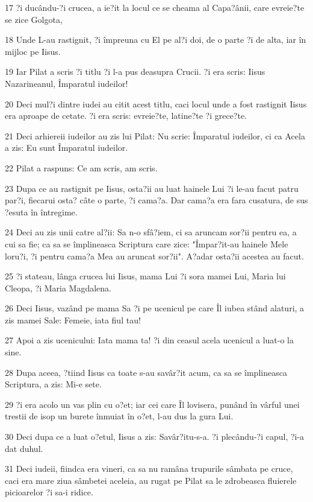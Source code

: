\par 17 ?i ducându-?i crucea, a ie?it la locul ce se cheama al Capa?ânii, care evreie?te se zice Golgota,
\par 18 Unde L-au rastignit, ?i împreuna cu El pe al?i doi, de o parte ?i de alta, iar în mijloc pe Iisus.
\par 19 Iar Pilat a scris ?i titlu ?i l-a pus deasupra Crucii. ?i era scris: Iisus Nazarineanul, Împaratul iudeilor!
\par 20 Deci mul?i dintre iudei au citit acest titlu, caci locul unde a fost rastignit Iisus era aproape de cetate. ?i era scris: evreie?te, latine?te ?i grece?te.
\par 21 Deci arhiereii iudeilor au zis lui Pilat: Nu scrie: Împaratul iudeilor, ci ca Acela a zis: Eu sunt Împaratul iudeilor.
\par 22 Pilat a raspuns: Ce am scris, am scris.
\par 23 Dupa ce au rastignit pe Iisus, osta?ii au luat hainele Lui ?i le-au facut patru par?i, fiecarui osta? câte o parte, ?i cama?a. Dar cama?a era fara cusatura, de sus ?esuta în întregime.
\par 24 Deci au zis unii catre al?ii: Sa n-o sfâ?iem, ci sa aruncam sor?ii pentru ea, a cui sa fie; ca sa se împlineasca Scriptura care zice: "Împar?it-au hainele Mele loru?i, ?i pentru cama?a Mea au aruncat sor?ii". A?adar osta?ii acestea au facut.
\par 25 ?i stateau, lânga crucea lui Iisus, mama Lui ?i sora mamei Lui, Maria lui Cleopa, ?i Maria Magdalena.
\par 26 Deci Iisus, vazând pe mama Sa ?i pe ucenicul pe care Îl iubea stând alaturi, a zis mamei Sale: Femeie, iata fiul tau!
\par 27 Apoi a zis ucenicului: Iata mama ta! ?i din ceasul acela ucenicul a luat-o la sine.
\par 28 Dupa aceea, ?tiind Iisus ca toate s-au savâr?it acum, ca sa se împlineasca Scriptura, a zis: Mi-e sete.
\par 29 ?i era acolo un vas plin cu o?et; iar cei care Îl lovisera, punând în vârful unei trestii de isop un burete înmuiat în o?et, l-au dus la gura Lui.
\par 30 Deci dupa ce a luat o?etul, Iisus a zis: Savâr?itu-s-a. ?i plecându-?i capul, ?i-a dat duhul.
\par 31 Deci iudeii, fiindca era vineri, ca sa nu ramâna trupurile sâmbata pe cruce, caci era mare ziua sâmbetei aceleia, au rugat pe Pilat sa le zdrobeasca fluierele picioarelor ?i sa-i ridice.
